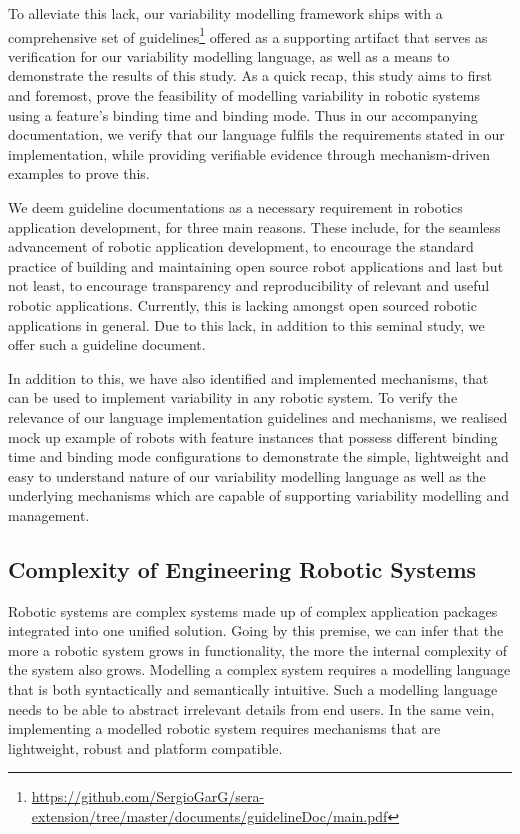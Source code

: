 \documentclass[conference]{IEEEtran}
\newcommand{\foot}[1]{\footnote{\url{#1}}}
\begin{document}
To alleviate this lack, our variability modelling framework ships with a comprehensive set of guidelines\foot{https://github.com/SergioGarG/sera-extension/tree/master/documents/guidelineDoc/main.pdf}
offered as a supporting artifact that serves as verification for our variability modelling language, as well as a means to demonstrate the results of this study. As a quick recap, this study aims to first and foremost, prove the feasibility of modelling variability in robotic systems using a feature's binding time and binding mode.  Thus in our accompanying documentation, we verify that our language fulfils the requirements stated in our implementation, while providing verifiable evidence through mechanism-driven examples to prove this.

We deem guideline documentations as a necessary requirement in robotics application development, for three main reasons. These include, for the seamless advancement of robotic application development, to encourage the standard practice of building and maintaining open source robot applications and last but not least, to encourage transparency and reproducibility of relevant and useful robotic applications. Currently, this is lacking amongst open sourced robotic applications in general. Due to this lack, in addition to this seminal study, we offer such a guideline document.

In addition to this, we have also identified and implemented mechanisms, that can be used to implement variability in any robotic system. To verify the relevance of our language implementation guidelines and mechanisms, we realised mock up example of robots with feature instances that possess different binding time and binding mode configurations to demonstrate the simple, lightweight and easy to understand nature of our variability modelling language as well as the underlying mechanisms which are capable of supporting variability modelling and management.

\subsection{Complexity of Engineering Robotic Systems}
Robotic systems are complex systems made up of complex application packages integrated into one unified solution. Going by this premise, we can infer that the more a robotic system grows in functionality, the more the internal complexity of the system also grows. Modelling a complex system requires a modelling language that is both syntactically and semantically intuitive. Such a modelling language needs to be able to abstract irrelevant details from end users. In the same vein, implementing a modelled robotic system requires mechanisms that are lightweight, robust and platform compatible.
\end{document}
